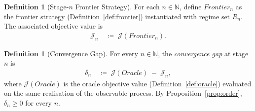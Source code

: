 \documentclass[12pt,openany]{book}
\numberwithin{equation}{chapter}
\theoremstyle{plain}
\theoremstyle{definition}
\newtheorem{definition}[theorem]{Definition}
\theoremstyle{remark}
\numberwithin{equation}{chapter}
\theoremstyle{plain}
\newcommand{\Oracle}{O}
\newcommand{\Frontier}{F}
\newcommand{\calR}{\mathcal{R}}
\def\Oracle{Oracle}%
\def\Frontier{Frontier}%
\def\calR{R}%
\begin{document}
\begin{definition}[Stage-$n$ Frontier Strategy]
\label{def:frontier-n}
For each $n \in \mathbb{N}$, define
$\Frontier_n$ as the frontier strategy
(Definition~\ref{def:frontier}) instantiated with regime
set $\calR_n$.
The associated objective value is
\begin{align}
  \mathcal{J}_n
  &\;\coloneqq\;
  \mathcal{J}(\Frontier_n).
  \label{eq:Jn}
\end{align}
\end{definition}

\begin{definition}[Convergence Gap]
\label{def:conv-gap}
For every $n \in \mathbb{N}$, the \emph{convergence gap}
at stage $n$ is
\begin{align}
  \delta_n
  &\;\coloneqq\;
  \mathcal{J}(\Oracle)
  \;-\;
  \mathcal{J}_n,
  \label{eq:delta-gap}
\end{align}
where $\mathcal{J}(\Oracle)$ is the oracle objective value
(Definition~\ref{def:oracle}) evaluated on the same
realisation of the observable process.
By Proposition~\ref{prop:order}, $\delta_n \geq 0$
for every $n$.
\end{definition}

\end{document}
